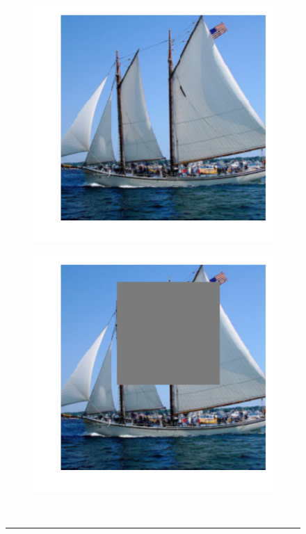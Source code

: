 \begin{figure}[ht!]
	\centering
	\begin{subfigure}{.4\textwidth}
		\centering
		\includegraphics[width=.75\textwidth]{data/cutout_off0}
	\end{subfigure}
	\begin{subfigure}{.4\textwidth}
		\centering
		\includegraphics[width=.75\textwidth]{data/cutout_on0}
	\end{subfigure} \vspace{1em} \\  \hrule \vspace{1em}
	\begin{subfigure}{.4\textwidth}
		\centering

\end{subfigure}
\end{figure}
